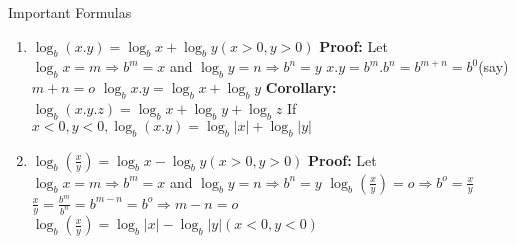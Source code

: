 \documentclass[aspectratio=1610,8pt]{beamer}
\newcounter{counter}
\begin{document}
\begin{frame}{Important Formulas}
  \begin{enumerate}
  \item $\log_b(x.y) = \log_b x + \log_by(x > 0, y >0)$
    \linebreak\linebreak
    \textbf{Proof:} Let $\log_bx = m\Rightarrow b^m = x$ and $\log_by = n \Rightarrow b^n = y$
    \linebreak\linebreak
    $x.y = b^m.b^n = b^{m+n} = b^0$(say)
    \linebreak\linebreak
    $m + n = o$
    \linebreak\linebreak
    $\log_bx.y = \log_b x + \log_b y$
    \linebreak\linebreak
    \textbf{Corollary:} $\log_b(x.y.z) = \log_bx + \log_by + \log_bz$
    \linebreak\linebreak
    If $x<0, y<0, \log_b(x.y) = \log_b|x| + \log_b|y|$
  \item $\log_b\left(\frac{x}{y}\right) = \log_b x - \log_b y(x>0, y>0)$
    \linebreak\linebreak
    \textbf{Proof:} Let $\log_bx = m \Rightarrow b^m = x$ and $\log_by = n \Rightarrow b^n = y$
    \linebreak\linebreak
    $\log_b\left(\frac{x}{y}\right) = o \Rightarrow b^o = \frac{x}{y}$
    \linebreak\linebreak
    $\frac{x}{y} = \frac{b^m}{b^n} = b^{m - n} = b^o \Rightarrow m - n = o$
    \linebreak\linebreak
    $\log_b\left(\frac{x}{y}\right) = \log_b|x| - \log_b|y|(x<0, y<0)$
    \setcounter{counter}{\value{enumi}}
  \end{enumerate}
\end{frame}
\end{document}
